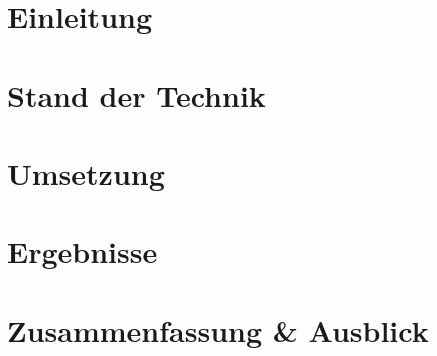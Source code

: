 \documentclass[a4paper,12pt, twoside]{scrreprt}
\begin{document}
\cleardoublepage   %
\tableofcontents

\chapter{Einleitung}


\chapter{Stand der Technik} %


\chapter{Umsetzung} %


\chapter{Ergebnisse}


\chapter{Zusammenfassung \& Ausblick}


	
	

\clearpage
{}
{}%

\end{document}
